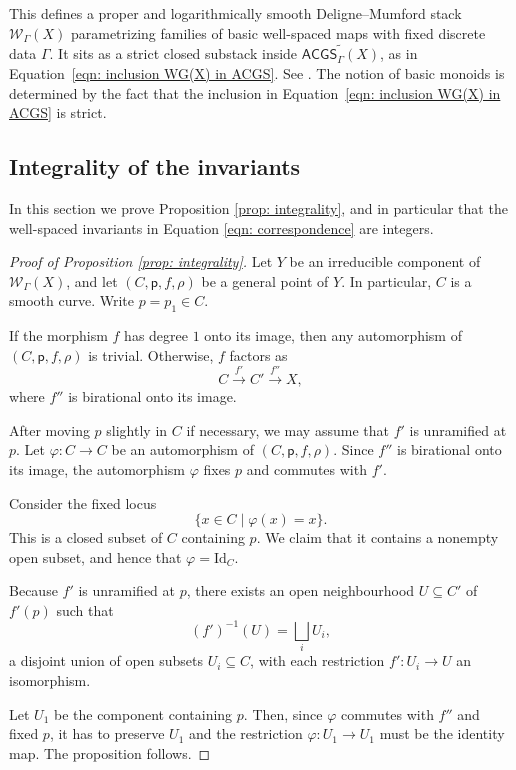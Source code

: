 \documentclass{article}
\newtheorem{proposition}[definition]{Proposition}
\begin{document}
This defines a proper and logarithmically smooth Deligne--Mumford stack $\mathcal{W}_{\Gamma}(X)$ parametrizing families of basic well-spaced maps with fixed discrete data $\Gamma$. It sits as a strict closed substack inside $\widetilde{\mathsf{ACGS}_{\Gamma}(X)}$, as in Equation~\eqref{eqn: inclusion WG(X) in ACGS}. See \cite[Theorems~3.4.10 and~3.5.1]{RSWII}. The notion of basic monoids is determined by the fact that the inclusion in Equation~\eqref{eqn: inclusion WG(X) in ACGS} is strict.

\subsection{Integrality of the invariants}\label{sec: integrality}

In this section we prove Proposition \ref{prop: integrality}, and in particular that the well-spaced invariants in Equation \eqref{eqn: correspondence} are integers.


\begin{proof}[Proof of Proposition \ref{prop: integrality}]
Let $Y$ be an irreducible component of $\mathcal{W}_\Gamma(X)$, and let $(C,\mathsf{p},f,\rho)$ be a general point of $Y$. In particular, $C$ is a smooth curve. Write  $p = p_1 \in C$.

If the morphism $f$ has degree $1$ onto its image, then any automorphism of $(C,\mathsf{p},f,\rho)$ is trivial. Otherwise, $f$ factors as
\[
C \xrightarrow{f'} C' \xrightarrow{f''} X,
\]
where $f''$ is birational onto its image.

After moving $p$ slightly in $C$ if necessary, we may assume that $f'$ is unramified at $p$. Let $\varphi : C \to C$ be an automorphism of $(C,\mathsf{p},f,\rho)$. Since $f''$ is birational onto its image, the automorphism $\varphi$ fixes $p$ and commutes with $f'$.

Consider the fixed locus
\[
\{ x \in C \mid \varphi(x) = x \}.
\]
This is a closed subset of $C$ containing $p$. We claim that it contains a nonempty open subset, and hence that $\varphi = \mathrm{Id}_C$.

Because $f'$ is unramified at $p$, there exists an open neighbourhood $U \subseteq C'$ of $f'(p)$ such that
\[
(f')^{-1}(U) = \bigsqcup_i U_i,
\]
a disjoint union of open subsets $U_i \subseteq C$, with each restriction $f' : U_i \to U$ an isomorphism.

Let $U_1$ be the component containing $p$. Then, since $\varphi$ commutes with $f''$ and fixed $p$, it has to preserve $U_1$ and the restriction $\varphi:U_1 \to U_1$ must be the identity map.
The proposition follows.
\end{proof}
\end{document}
